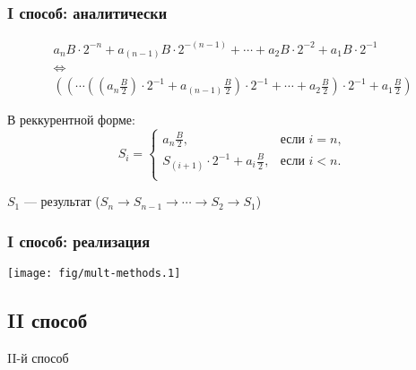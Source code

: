 \begin{frame}
    \frametitle{I способ: аналитически}

    \begin{gather*}
        a_{n}B\cdot2^{-n}+a_{(n-1)}B\cdot2^{-(n-1)}+ \cdots 
        +a_{2}B\cdot2^{-2}+a_{1}B\cdot2^{-1}
        \\
        \Leftrightarrow
        \\
        \left(\left(\cdots\left(\left(a_{n}\frac{B}{2}\right)\cdot 2^{-1} 
            + a_{(n-1)}\frac{B}{2}\right)\cdot 2^{-1} 
                + \cdots 
                    + a_{2}\frac{B}{2}\right)\cdot 2^{-1}
                        + a_{1}\frac{B}{2}\right)
    \end{gather*}

    В реккурентной форме:
    \[
        S_i=
        \begin{cases}
            \displaystyle a_{n}\frac{B}{2},                         &\text{если $i=n$},\\
            \displaystyle S_{(i+1)}\cdot 2^{-1} + a_i\frac{B}{2},   &\text{если $i<n$}.\\
        \end{cases}
    \]
    
    $S_1$ --- результат ($S_n\to S_{n-1}\to\cdots\to S_2\to S_1$)
\end{frame}

\begin{frame}
    \frametitle{I способ: реализация}
    
    \begin{center}
        \texttt{[image: fig/mult-methods.1]}
    \end{center}
\end{frame}

\subsection{II способ}

\begin{frame}
    \begin{center}
        II-й способ
    \end{center}
\end{frame}

